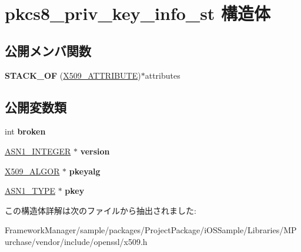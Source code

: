 \hypertarget{structpkcs8__priv__key__info__st}{}\section{pkcs8\+\_\+priv\+\_\+key\+\_\+info\+\_\+st 構造体}
\label{structpkcs8__priv__key__info__st}
\subsection*{公開メンバ関数}
\begin{DoxyCompactItemize}
\item 
\hypertarget{structpkcs8__priv__key__info__st_ab054fe497c497b9eab7901a2de8868e4}{}{\bfseries S\+T\+A\+C\+K\+\_\+\+O\+F} (\hyperlink{structx509__attributes__st}{X509\+\_\+\+A\+T\+T\+R\+I\+B\+U\+T\+E})$\ast$attributes\label{structpkcs8__priv__key__info__st_ab054fe497c497b9eab7901a2de8868e4}

\end{DoxyCompactItemize}
\subsection*{公開変数類}
\begin{DoxyCompactItemize}
\item 
\hypertarget{structpkcs8__priv__key__info__st_a0c1159bfe2a447810dc518175c77c225}{}int {\bfseries broken}\label{structpkcs8__priv__key__info__st_a0c1159bfe2a447810dc518175c77c225}

\item 
\hypertarget{structpkcs8__priv__key__info__st_a5e3bdcbf50b8971fcb60a8f7d71a36fb}{}\hyperlink{structasn1__string__st}{A\+S\+N1\+\_\+\+I\+N\+T\+E\+G\+E\+R} $\ast$ {\bfseries version}\label{structpkcs8__priv__key__info__st_a5e3bdcbf50b8971fcb60a8f7d71a36fb}

\item 
\hypertarget{structpkcs8__priv__key__info__st_af94f0f4f185de14be5b0b88bb638b3e8}{}\hyperlink{struct_x509__algor__st}{X509\+\_\+\+A\+L\+G\+O\+R} $\ast$ {\bfseries pkeyalg}\label{structpkcs8__priv__key__info__st_af94f0f4f185de14be5b0b88bb638b3e8}

\item 
\hypertarget{structpkcs8__priv__key__info__st_aba8fbcabba1fdcf6ff0f41901a9b042c}{}\hyperlink{structasn1__type__st}{A\+S\+N1\+\_\+\+T\+Y\+P\+E} $\ast$ {\bfseries pkey}\label{structpkcs8__priv__key__info__st_aba8fbcabba1fdcf6ff0f41901a9b042c}

\end{DoxyCompactItemize}


この構造体詳解は次のファイルから抽出されました\+:\begin{DoxyCompactItemize}
\item 
Framework\+Manager/sample/packages/\+Project\+Package/i\+O\+S\+Sample/\+Libraries/\+M\+Purchase/vendor/include/openssl/x509.\+h\end{DoxyCompactItemize}
